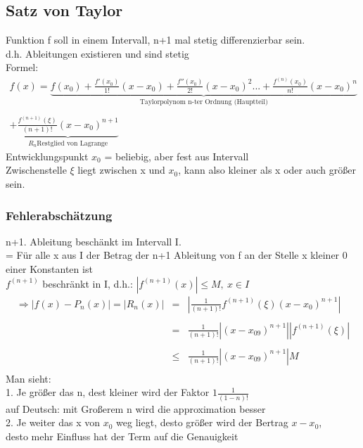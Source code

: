 \documentclass[12pt,a4paper]{article}
\renewenvironment{shaded}{%
	\def\FrameCommand{\fboxsep=\FrameSep \colorbox{shadecolor}}%
	\MakeFramed{\advance\hsize-\width \FrameRestore\FrameRestore}}%
{\endMakeFramed}
\begin{document}
\subsection{Satz von Taylor}
Funktion f soll in einem Intervall, n+1 mal stetig differenzierbar sein.\\
d.h. Ableitungen existieren und sind stetig\\
Formel:
\begin{shaded}
	$$
	\begin{matrix}
	f(x)=\underbrace{f(x_0)+\frac{f'(x_0)}{1!}\left(x-x_0\right)+\frac{f''(x_0)}{2!}\left(x-x_0\right)^2...+\frac{f^{(n)}(x_0)}{n!}\left(x-x_0\right)^n}_{\text{Taylorpolynom n-ter Ordnung (Hauptteil)}}\\
	\\
	+\underbrace{\frac{f^{(n+1)}(\xi)}{\left(n+1\right)!}\left(x-x_0\right)^{n+1}}_{R_n \text{Restglied von Lagrange}}
	\end{matrix}
	$$
\end{shaded}
Entwicklungspunkt $x_0$ = beliebig, aber fest aus Intervall\\
Zwischenstelle $\xi$ liegt zwischen x und $x_0$, kann also kleiner als x oder auch größer sein.\\
\subsubsection{Fehlerabschätzung}
n+1. Ableitung beschänkt im Intervall I.\\
= Für alle x aus I der Betrag der n+1 Ableitung von f an der Stelle x kleiner 0 einer Konstanten ist\\
$f^{(n+1)}$ beschränkt in I, d.h.:
\begin{shaded}
	$\left|f^{(n+1)}(x)\right|\leq M,\ x\in I$
\end{shaded}
$$
\begin{matrix}
\Rightarrow\left|f(x)-P_n(x)\right|=\left|R_n(x)\right| &=& \left|\frac{1}{\left(n+1\right)!}f^{(n+1)}(\xi)\left(x-x_0\right)^{n+1}\right| \\
\\
&=& \frac{1}{\left(n+1\right)!}\left|\left(x-x_09\right)^{n+1}\right|\left|f^{(n+1)}(\xi)\right| \\
\\
&\leq& \frac{1}{\left(n+1\right)!}\left|\left(x-x_09\right)^{n+1}\right| M \\
\end{matrix}
$$
\newpage
Man sieht:\\
1. Je größer das n, dest kleiner wird der Faktor $1\frac{1}{(1-n)!}$\\
auf Deutsch: mit Großerem n wird die approximation besser\\
2. Je weiter das x von $x_0$ weg liegt, desto größer wird der Bertrag $x-x_0$, \\
desto mehr Einfluss hat der Term auf die Genauigkeit\\
\end{document}
